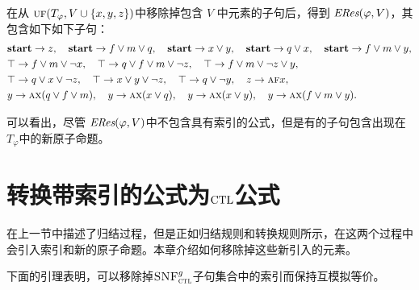 \begin{example}
	在从 $\textsc{uf}(T_\varphi, V\cup \{x,y,z\})$中移除掉包含 $V$ 中元素的子句后，得到 $\emph{ERes}(\varphi,V)$，其包含如下如下子句：
	\begin{align*}%
		&\start\rto z, \quad \start \rto f\vee m \vee q, \quad  \start \rto x \vee y, \quad \start \rto q \vee x, \quad	\start \rto f\vee m \vee y, \\
		& \top \rto f \vee m \vee \neg x, \quad		\top \rto q \vee f \vee m\vee \neg z,
		\quad  	\top \rto f \vee m \vee \neg z \vee y,\\
		& \top \rto q \vee x\vee \neg z, \quad 	\top \rto x \vee y \vee \neg z, \quad 	\top \rto q\vee\neg y , \quad z \rto \ALL \FUTURE x, \\
		& y \rto \ALL\NEXT(q \vee f\vee m), \quad  y \rto \ALL\NEXT(x\vee q), \quad y \rto \ALL \NEXT(x\vee y),\quad 	y \rto \ALL\NEXT(f\vee m\vee y).
	\end{align*}
	
	可以看出，尽管 $\emph{ERes}(\varphi,V)$中不包含具有索引的公式，但是有的子句包含出现在 $T_\varphi$中的新原子命题。
\end{example}


\section{转换带索引的公式为$\textrm{CTL}$公式}
\label{cha4:sec:remIndex}
在上一节中描述了归结过程，但是正如归结规则和转换规则所示，在这两个过程中会引入索引和新的原子命题。本章介绍如何移除掉这些新引入的元素。

下面的引理表明，可以移除掉${\textsc{SNF}_{\textsc{ctl}}^g}$子句集合中的索引而保持互模拟等价。

